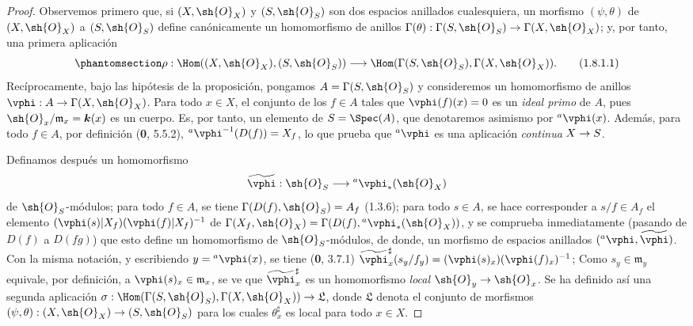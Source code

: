 \documentclass[oneside,10pt]{amsart}
\makeatletter
\newcommand{\ega@arrow}[2]{\mathchoice{#1}{#2}{#2}{#2}}
\renewcommand{\to}{\ega@arrow{\longrightarrow}{\rightarrow}}
\let\EGAOriginalLabel\label
\renewcommand{\label}[1]{\phantomsection\EGAOriginalLabel{#1}}
\makeatother
\begin{document}
\begin{proof}
Observemos primero que, si $(X,\sh{O}_X)$ y $(S,\sh{O}_S)$ son dos
espacios anillados cualesquiera, un morfismo $(\psi,\theta)$ de
$(X,\sh{O}_X)$ a $(S,\sh{O}_S)$ define canónicamente un homomorfismo
de anillos
$\Gamma(\theta):\Gamma(S,\sh{O}_S)\to\Gamma(X,\sh{O}_X)$;
y, por tanto, una primera aplicación
\begin{equation}
\label{ega2:addendum:I.1.8.1.1-fr}
  \rho:\Hom((X,\sh{O}_X),(S,\sh{O}_S))
  \to\Hom(\Gamma(S,\sh{O}_S),\Gamma(X,\sh{O}_X)).
\tag{1.8.1.1}
\end{equation}
Recíprocamente, bajo las hipótesis de la proposición, pongamos
$A=\Gamma(S,\sh{O}_S)$ y consideremos un homomorfismo de anillos
$\vphi:A\to\Gamma(X,\sh{O}_X)$. Para todo $x\in X$, el conjunto de
los $f\in A$ tales que $\vphi(f)(x)=0$ es un \emph{ideal primo} de $A$, pues
$\sh{O}_x/\mathfrak m_x=\boldsymbol{k}(x)$ es un cuerpo. Es, por tanto, un
elemento de $S=\Spec(A)$, que denotaremos asimismo por
${}^a\vphi(x)$. Además, para todo $f\in A$, por definición (\textbf 0, 5.5.2),
${}^a\vphi^{-1}(D(f))=X_f$,
lo que prueba que ${}^a\vphi$ es una aplicación \emph{continua} $X\to S$.

Definamos después un homomorfismo
\[
  \widetilde{\vphi}:\sh{O}_S\to{}^a\vphi_*(\sh{O}_X)
\] de $\sh{O}_S$-módulos; para todo $f\in A$, se tiene
$\Gamma(D(f),\sh{O}_S)=A_f$ (1.3.6); para todo $s\in A$, se hace corresponder a $s/f\in A_f$ el elemento
$(\vphi(s)|X_f)(\vphi(f)|X_f)^{-1}$ de $\Gamma(X_f,\sh{O}_X)=\Gamma(D(f),{}^a\vphi_*(\sh{O}_X))$,
y se comprueba inmediatamente (pasando de $D(f)$ a $D(fg)$) que esto define un homomorfismo de $\sh{O}_S$-módulos, de donde, un morfismo de espacios
anillados $({}^a\vphi,\widetilde{\vphi})$. Con la misma notación, y
escribiendo $y={}^a\vphi(x)$, se tiene (\textbf 0, 3.7.1)
$\widetilde{\vphi}_x^\sharp(s_y/f_y)=(\vphi(s)_x)(\vphi(f)_x)^{-1}$;
Como $s_y\in\mathfrak m_y$ equivale, por definición, a
$\vphi(s)_x\in\mathfrak m_x$, se ve que $\widetilde{\vphi}_x^\sharp$ es un homomorfismo \emph{local} $\sh{O}_y\to\sh{O}_x$. Se ha
definido así una segunda aplicación
$\sigma:\Hom(\Gamma(S,\sh{O}_S),\Gamma(X,\sh{O}_X))\to\mathfrak L$,
donde $\mathfrak L$ denota el conjunto de morfismos
$(\psi,\theta):(X,\sh{O}_X)\to(S,\sh{O}_S)$ para los cuales
$\theta_x^\sharp$ es local para todo $x\in X$.


\end{proof}
\end{document}
